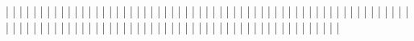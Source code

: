 |                                   |                                   |
|                                   |                                   |
|                                   |                                   |
|                                   |                                   |
|                                   |                                   |
|                                   |                                   |
|                                   |                                   |
|                                   |                                   |
|                                   |                                   |
|                                   |                                   |
|                                   |                                   |
|                                   |                                   |
|                                   |                                   |
|                                   |                                   |
|                                   |                                   |
|                                   |                                   |
|                                   |                                   |
|                                   |                                   |
|                                   |                                   |
|                                   |                                   |
|                                   |                                   |
|                                   |                                   |
|                                   |                                   |
|                                   |                                   |
|                                   |                                   |
|                                   |                                   |
|                                   |                                   |
|                                   |                                   |
|                                   |                                   |
|                                   |                                   |
|                                   |                                   |
|                                   |                                   |
|                                   |                                   |
|                                   |                                   |
|                                   |                                   |
|                                   |                                   |
